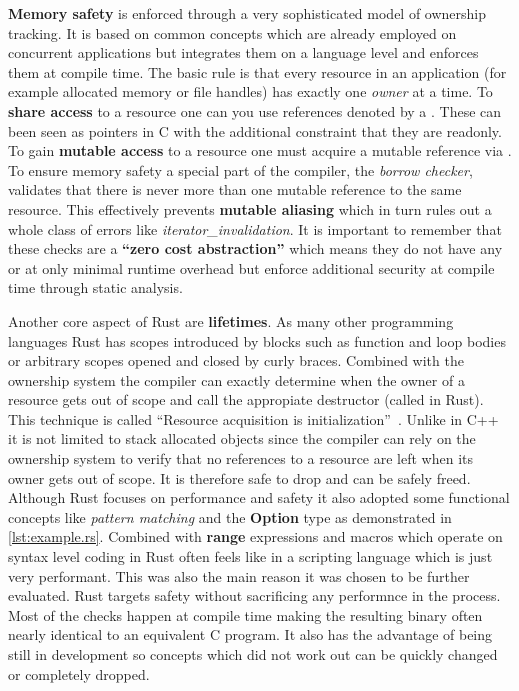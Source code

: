 \textbf{Memory safety} is enforced through a very sophisticated model of ownership tracking. It is based on common concepts which are already employed on concurrent applications but integrates them on a language level and enforces them at compile time. The basic rule is that every resource in an application (for example allocated memory or file handles) has exactly one \textit{owner} at a time. To \textbf{share access} to a resource one can you use references denoted by a \shinline{\&}. These can been seen as pointers in C with the additional constraint that they are readonly. To gain \textbf{mutable access} to a resource one must acquire a mutable reference via . To ensure memory safety a special part of the compiler, the \textit{borrow checker}, validates that there is never more than one mutable reference to the same resource. This effectively prevents \textbf{mutable aliasing} which in turn rules out a whole class of errors like \textit{\gls{iterator_invalidation}}. It is important to remember that these checks are a \textbf{``zero cost abstraction''} which means they do not have any or at only minimal runtime overhead but enforce additional security at compile time through static analysis.

Another core aspect of Rust are \textbf{lifetimes}. As many other programming languages Rust has scopes introduced by blocks such as function and loop bodies or arbitrary scopes opened and closed by curly braces. Combined with the ownership system the compiler can exactly determine when the owner of a resource gets out of scope and call the appropiate destructor (called  in Rust). This technique is called ``Resource acquisition is initialization''~\cite[p. 389]{evolution_c++}. Unlike in C++ it is not limited to stack allocated objects since the compiler can rely on the ownership system to verify that no references to a resource are left when its owner gets out of scope. It is therefore safe to drop and can be safely freed.
\\


Although Rust focuses on performance and safety it also adopted some functional concepts like \textit{pattern matching} and the \textbf{Option} type as demonstrated in \autoref{lst:example.rs}. Combined with \textbf{range} expressions and macros which operate on syntax level coding in Rust often feels like in a scripting language which is just very performant. This was also the main reason it was chosen to be further evaluated. Rust targets safety without sacrificing any performnce in the process. Most of the checks happen at compile time making the resulting binary often nearly identical to an equivalent C program. It also has the advantage of being still in development so concepts which did not work out can be quickly changed or completely dropped.

